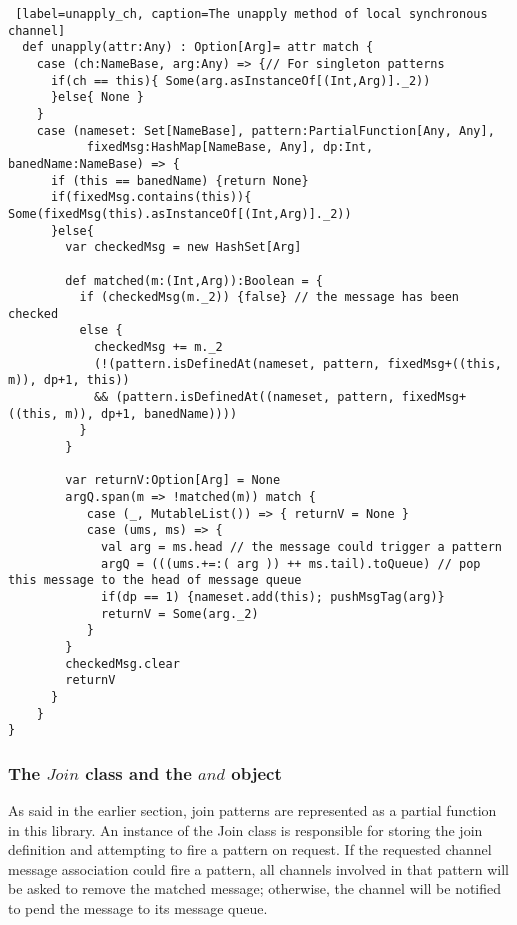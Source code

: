 \begin{lstlisting} [label=unapply_ch, caption=The unapply method of local synchronous channel]
  def unapply(attr:Any) : Option[Arg]= attr match { 
    case (ch:NameBase, arg:Any) => {// For singleton patterns
      if(ch == this){ Some(arg.asInstanceOf[(Int,Arg)]._2))
      }else{ None }
    }
    case (nameset: Set[NameBase], pattern:PartialFunction[Any, Any], 
           fixedMsg:HashMap[NameBase, Any], dp:Int, banedName:NameBase) => {
      if (this == banedName) {return None}      
      if(fixedMsg.contains(this)){ Some(fixedMsg(this).asInstanceOf[(Int,Arg)]._2))
      }else{        
        var checkedMsg = new HashSet[Arg]
        
        def matched(m:(Int,Arg)):Boolean = {
          if (checkedMsg(m._2)) {false} // the message has been checked
          else { 
            checkedMsg += m._2
            (!(pattern.isDefinedAt(nameset, pattern, fixedMsg+((this, m)), dp+1, this))
            && (pattern.isDefinedAt((nameset, pattern, fixedMsg+((this, m)), dp+1, banedName))))
          }
        }
        
        var returnV:Option[Arg] = None
        argQ.span(m => !matched(m)) match {
           case (_, MutableList()) => { returnV = None }
           case (ums, ms) => {
             val arg = ms.head // the message could trigger a pattern
             argQ = (((ums.+=:( arg )) ++ ms.tail).toQueue) // pop this message to the head of message queue
             if(dp == 1) {nameset.add(this); pushMsgTag(arg)}
             returnV = Some(arg._2)
           }
        }
        checkedMsg.clear
        returnV
      }
    }
}
\end{lstlisting}

\subsubsection{The $Join$ class and the $and$ object}
\label{join_and}
As said in the earlier section, join patterns are represented as a partial function in this library.  An instance of the Join class is responsible for storing the join definition and attempting to fire a pattern on request.  If the requested channel message association could fire a pattern, all channels involved in that pattern will be asked to remove the matched message;  otherwise, the channel will be notified to pend the message to its message queue.

